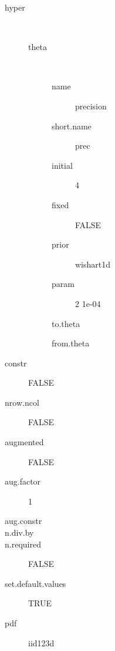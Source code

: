 \begin{description}
	\item[hyper]\ 
	 \begin{description}
	 	\item[theta]\ 
	 	 \begin{description}
	 	 	 \item[ name ] precision 
	 	 	 \item[ short.name ] prec 
	 	 	 \item[ initial ] 4 
	 	 	 \item[ fixed ] FALSE 
	 	 	 \item[ prior ] wishart1d 
	 	 	 \item[ param ] 2 1e-04 
	 	 	 \item[ to.theta ] \verb|| 
	 	 	 \item[ from.theta ] \verb|| 
	 	 \end{description}
	 \end{description}
	 \item[ constr ] FALSE 
	 \item[ nrow.ncol ] FALSE 
	 \item[ augmented ] FALSE 
	 \item[ aug.factor ] 1 
	 \item[ aug.constr ]  
	 \item[ n.div.by ]  
	 \item[ n.required ] FALSE 
	 \item[ set.default.values ] TRUE 
	 \item[ pdf ] iid123d 
\end{description}
